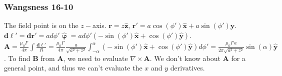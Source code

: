 \documentclass[crop=false,class=article,oneside]{standalone}
\begin{document}
        \subsubsection{Wangsness 16-10}
        The field point is on the $z-$axis. $\mathbf{r} = z\hat{\mathbf{z}}$, $\mathbf{r}' =  a\cos(\phi')\hat{\mathbf{x}}+a\sin(\phi')\hat{\mathbf{y}}$. $\mathbf{d\ell}' = \mathbf{dr}' = ad\phi' \hat{\boldsymbol{\upvarphi}} = ad\phi' (-\sin(\phi')\hat{\mathbf{x}}+\cos(\phi')\hat{\mathbf{y}})$. $\mathbf{A} = \frac{\mu_0 I'}{4\pi} \int \frac{\mathbf{d\ell}'}{R} = \frac{\mu_0 I'}{4\pi} \frac{a}{\sqrt{a^2+z^2}}\int_{-\alpha}^{\alpha} (-\sin(\phi')\hat{\mathbf{x}}+\cos(\phi')\hat{\mathbf{y}})d\phi' = \frac{\mu_0 I'a}{2\pi \sqrt{a^2+z^2}}\sin(\alpha)\hat{\mathbf{y}}$. To find $\mathbf{B}$ from $\mathbf{A}$, we need to evaluate $\nabla \times \mathbf{A}$. We don't know about $\mathbf{A}$ for a general point, and thus we can't evaluate the $x$ and $y$ derivatives.
\end{document}
